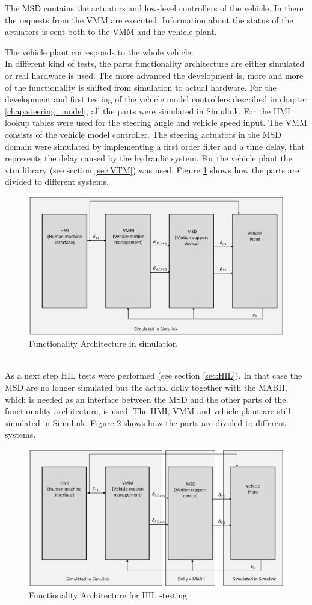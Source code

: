 \documentclass[ExampleMasters.tex]{subfiles}
\begin{document}
The \gls{MSD} contains the actuators and low-level controllers of the vehicle. In there the requests from the \gls{VMM} are executed. Information about the status of the actuators is sent both to the \gls{VMM} and the vehicle plant.

The vehicle plant corresponds to the whole vehicle.
\\
In different kind of tests, the parts functionality architecture are either simulated or real hardware is used. The more advanced the development is, more and more of the functionality is shifted from simulation to actual hardware. For the development and first testing of the vehicle model controllers described in chapter \ref{chap:steering_model}, all the parts were simulated in Simulink. For the \gls{HMI} lookup tables were used for the steering angle and vehicle speed input. The \gls{VMM} consists of the vehicle model controller. The steering actuators in the \gls{MSD} domain were simulated by implementing a first order filter and a time delay, that represents the delay caused by the hydraulic system. For the vehicle plant the \gls{vtm} library (see section \ref{sec:VTM}) was used. Figure \ref{fig:funct_architecture_sim} shows how the parts are divided to different systems.
\begin{figure}[h]
	\centering
	\includegraphics[width=0.5\linewidth]{figures/functionality_architecture_sim}
	
	\caption{Functionality Architecture in simulation}
	\label{fig:funct_architecture_sim}
\end{figure}\\
As a next step \gls{HIL} tests were performed (see section \ref{sec:HIL}). In that case the \gls{MSD} are no longer simulated but the actual dolly together with the \gls{MABII}, which is needed as an interface between the \gls{MSD} and the other parts of the functionality architecture, is used. The \gls{HMI}, \gls{VMM} and vehicle plant are still simulated in Simulink. Figure \ref{fig:funct_architecture_hil} shows how the parts are divided to different systems.
\begin{figure}[h]
	\centering
	\includegraphics[width=0.5\linewidth]{figures/functionality_architecture_hil}
	
	\caption{Functionality Architecture for \gls{HIL} -testing}
	\label{fig:funct_architecture_hil}
\end{figure}\\
\end{document}
